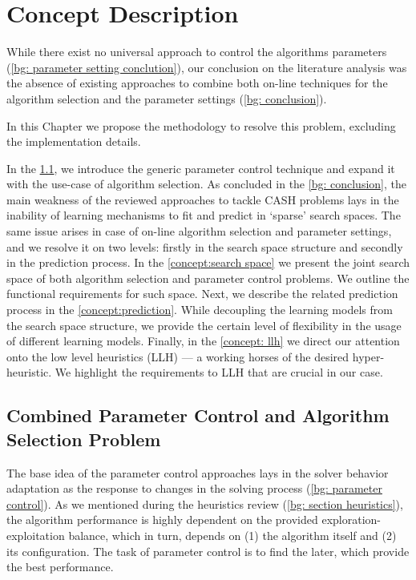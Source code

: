 \chapter{Concept Description}
While there exist no universal approach to control the algorithms parameters (\cref{bg: parameter setting conclution}), our conclusion on the literature analysis was the absence of existing approaches to combine both on-line techniques for the algorithm selection and the parameter settings (\cref{bg: conclusion}). 

In this Chapter we propose the methodology to resolve this problem, excluding the implementation details.

In the \cref{concept:parameter control}, we introduce the generic parameter control technique and expand it with the use-case of algorithm selection. As concluded in the \cref{bg: conclusion}, the main weakness of the reviewed approaches to tackle CASH problems lays in the inability of learning mechanisms to fit and predict in `sparse' search spaces. The same issue arises in case of on-line algorithm selection and parameter settings, and we resolve it on two levels: firstly in the search space structure and secondly in the prediction process. In the \cref{concept:search space} we present the joint search space of both algorithm selection and parameter control problems. We outline the functional requirements for such space. Next, we describe the related prediction process in the \cref{concept:prediction}. While decoupling the learning models from the search space structure, we provide the certain level of flexibility in the usage of different learning models.
Finally, in the \cref{concept: llh} we direct our attention onto the low level heuristics (LLH) — a working horses of the desired hyper-heuristic. We highlight the requirements to LLH that are crucial in our case.


\section{Combined Parameter Control and Algorithm Selection Problem}\label{concept:parameter control}
The base idea of the parameter control approaches lays in the solver behavior adaptation as the response to changes in the solving process (\cref{bg: parameter control}). As we mentioned during the heuristics review (\cref{bg: section heuristics}), the algorithm performance is highly dependent on the provided exploration-exploitation balance, which in turn, depends on (1) the algorithm itself and (2) its configuration. The task of parameter control is to find the later, which provide the best performance.

